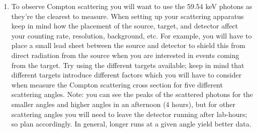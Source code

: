 \documentclass{../lab}
\begin{document}
\begin{enumerate}
	Determine the uncertainties in your fit parameters and the value of the reduced $x^2$. If you are missing the 59.54 keV peak (far right), your amplification/gain is probably too high.
	
	

    \item To observe Compton scattering you will want to use the 59.54 keV photons as they're the clearest to measure. When setting up your scattering apparatus keep in mind how the placement of the source, target, and detector affect your counting rate, resolution, background, etc. For example, you will have to place a small lead sheet between the source and detector to shield this from direct radiation from the source when you are interested in events coming from the target. Try using the different targets available; keep in mind that different targets introduce different factors which you will have to consider when measure the Compton scattering cross section for five different scattering angles. Note: you can see the peaks of the scattered photons for the smaller angles and higher angles in an afternoon (4 hours), but for other scattering angles you will need to leave the detector running after lab-hours; so plan accordingly. In general, longer runs at a given angle yield better data.


\end{enumerate}
\end{document}
